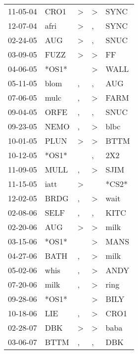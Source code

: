 \begin{supertabular}{lllll}
 11-05-04 &   CRO1 &     \textgreater &     \textgreater &   SYNC \\
 12-07-04 &   afri &     \textgreater &                , &   SYNC \\
 02-24-05 &    AUG &     \textgreater &                , &   SNUC \\
 03-09-05 &   FUZZ &     \textgreater &     \textgreater &     FF \\
 04-06-05 &  *OS1* &                  &     \textgreater &   WALL \\
 05-11-05 &   blom &                , &                , &    AUG \\
 07-06-05 &   mulc &                , &     \textgreater &   FARM \\
 09-04-05 &   ORFE &                , &                , &   SNUC \\
 09-23-05 &   NEMO &                , &     \textgreater &   blbc \\
 10-01-05 &   PLUN &     \textgreater &     \textgreater &   BTTM \\
 10-12-05 &  *OS1* &                  &                , &    2X2 \\
 11-09-05 &   MULL &                , &     \textgreater &   SJIM \\
 11-15-05 &   iatt &     \textgreater &                  &  *CS2* \\
 12-02-05 &   BRDG &                , &     \textgreater &   wait \\
 02-08-06 &   SELF &                , &                , &   KITC \\
 02-20-06 &    AUG &     \textgreater &     \textgreater &   milk \\
 03-15-06 &  *OS1* &                  &     \textgreater &   MANS \\
 04-27-06 &   BATH &                , &     \textgreater &   milk \\
 05-02-06 &   whis &                , &     \textgreater &   ANDY \\
 07-20-06 &   milk &                , &     \textgreater &   ring \\
 09-28-06 &  *OS1* &                  &     \textgreater &   BILY \\
 10-18-06 &    LIE &                , &     \textgreater &   CRO1 \\
 02-28-07 &    DBK &     \textgreater &     \textgreater &   baba \\
 03-06-07 &   BTTM &                , &                , &    DBK \\

\end{supertabular}
